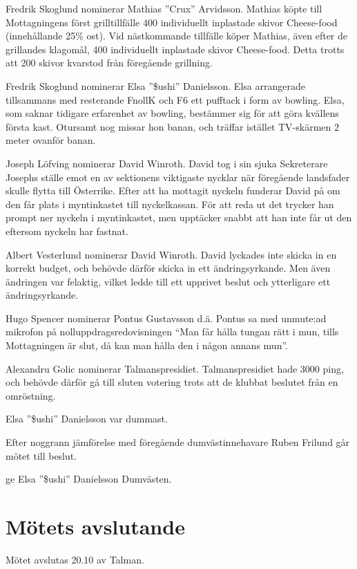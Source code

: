 \documentclass[hidelinks]{../sektionsmote} %
\begin{document}
Fredrik Skoglund nominerar Mathias ''Crux'' Arvidsson.
Mathias köpte till Mottagningens först grilltillfälle 400 individuellt inplastade skivor Cheese-food (innehållande 25\% ost).
Vid nästkommande tillfälle köper Mathias, även efter de grillandes klagomål, 400 individuellt inplastade skivor Cheese-food.
Detta trotts att 200 skivor kvarstod från föregående grillning.

Fredrik Skoglund nominerar Elsa ''\$ushi'' Danielsson.
Elsa arrangerade tillsammans med resterande FnollK och F6 ett pufftack i form av bowling.
Elsa, som saknar tidigare erfarenhet av bowling, bestämmer sig för att göra kvällens första kast.
Otursamt nog missar hon banan, och träffar istället TV-skärmen 2 meter ovanför banan.

Joseph Löfving nominerar David Winroth.
David tog i sin sjuka Sekreterare Josephs ställe emot en av sektionens viktigaste nycklar när föregående landsfader skulle flytta till Österrike.
Efter att ha mottagit nyckeln funderar David på om den får plats i myntinkastet till nyckelkassan.
För att reda ut det trycker han prompt ner nyckeln i myntinkastet, men upptäcker snabbt att han inte får ut den eftersom nyckeln har fastnat.

Albert Vesterlund nominerar David Winroth.
David lyckades inte skicka in en korrekt budget, och behövde därför skicka in ett ändringsyrkande.
Men även ändringen var felaktig, vilket ledde till ett upprivet beslut och ytterligare ett ändringsyrkande.

Hugo Spencer nominerar Pontus Gustavsson d.ä.
Pontus sa med unmute:ad mikrofon på nolluppdragsredovisningen \enquote{Man får hålla tungan rätt i mun, tills Mottagningen är slut, då kan man hålla den i någon annans mun}.

Alexandru Golic nominerar Talmanspresidiet.
Talmanspresidiet hade 3000 ping, och behövde därför gå till sluten votering trots att de klubbat beslutet från en omröstning.

\begin{beslut}
    \item Elsa ''\$ushi'' Danielsson var dummast.
\end{beslut}
Efter noggrann jämförelse med föregående dumvästinnehavare Ruben Frilund går mötet till beslut.
\begin{beslut}
    \item ge Elsa ''\$ushi'' Danielsson Dumvästen.
\end{beslut}


\section{Mötets avslutande}
Mötet avslutas 20.10 av Talman.
\end{document}
